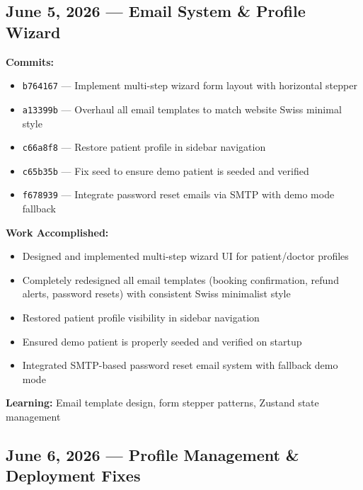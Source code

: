 \documentclass[11pt,a4paper]{article}
\begin{document}
\subsection{June 5, 2026 — Email System \& Profile Wizard}

\textbf{Commits:}
\begin{itemize}
  \item \texttt{b764167} — Implement multi-step wizard form layout with horizontal stepper
  \item \texttt{a13399b} — Overhaul all email templates to match website Swiss minimal style
  \item \texttt{c66a8f8} — Restore patient profile in sidebar navigation
  \item \texttt{c65b35b} — Fix seed to ensure demo patient is seeded and verified
  \item \texttt{f678939} — Integrate password reset emails via SMTP with demo mode fallback
\end{itemize}

\textbf{Work Accomplished:}
\begin{itemize}
  \item Designed and implemented multi-step wizard UI for patient/doctor profiles
  \item Completely redesigned all email templates (booking confirmation, refund alerts,
        password resets) with consistent Swiss minimalist style
  \item Restored patient profile visibility in sidebar navigation
  \item Ensured demo patient is properly seeded and verified on startup
  \item Integrated SMTP-based password reset email system with fallback demo mode
\end{itemize}

\textbf{Learning:} Email template design, form stepper patterns, Zustand state management

\subsection{June 6, 2026 — Profile Management \& Deployment Fixes}
\end{document}
